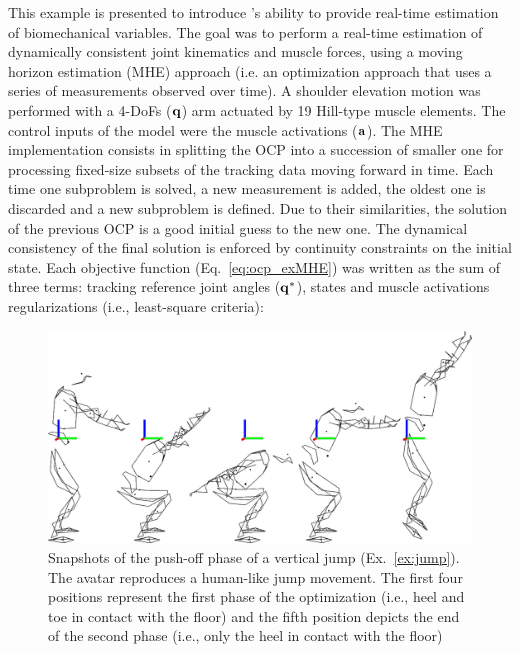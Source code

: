 This example is presented to introduce \bioptim's ability to provide real-time estimation of biomechanical variables.
The goal was to perform a real-time estimation of dynamically consistent joint kinematics and muscle forces, using a moving horizon estimation (MHE) approach (i.e. an optimization approach that uses a series of measurements observed over time). 
A shoulder elevation motion was performed with a 4-DoFs ($\bf{q}$) arm actuated by 19 Hill-type muscle elements.
The control inputs of the model were the muscle activations ($\bf{a}$).
The MHE implementation consists in splitting the OCP into a succession of smaller one for processing fixed-size subsets of the tracking data moving forward in time. 
Each time one subproblem is solved, a new measurement is added, the oldest one is discarded and a new subproblem is defined. 
Due to their similarities, the solution of the previous OCP is a good initial guess to the new one. 
The dynamical consistency of the final solution is enforced by continuity constraints on the initial state. 
Each objective function (Eq.~\ref{eq:ocp_exMHE}) was written as the sum of three terms: tracking reference joint angles ($\bf{q^*}$), states and muscle activations regularizations (i.e., least-square criteria): 
\begin{figure}[t!]
\includegraphics[width=\columnwidth]{figures/kinogramme_jump}
\caption{Snapshots of the push-off phase of a vertical jump (Ex.~\ref{ex:jump}). The avatar reproduces a human-like jump movement. The first four positions represent the first phase of the optimization (i.e., heel and toe in contact with the floor) and the fifth position depicts the end of the second phase (i.e., only the heel in contact with the floor)} 
\label{fig:graph_force_vitesse_longueur}
\end{figure}
